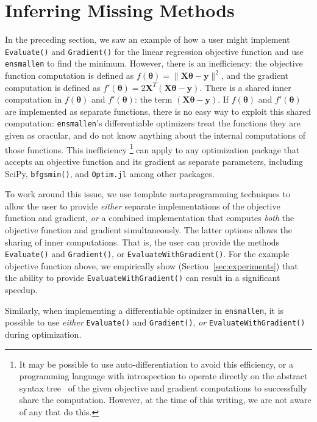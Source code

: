 \section{Inferring Missing Methods}
\label{sec:automatic}

In the preceding section, we saw an example of how a user might implement {\tt
Evaluate()} and {\tt Gradient()} for the linear regression objective function
and use {\tt ensmallen} to find the minimum.
However, there is an inefficiency:
the objective function computation is defined as $f(\bm \theta) = \| \bm X \bm \theta - \bm y \|^2$,
and the gradient computation is defined as $f'(\bm \theta) = 2 \bm X^T (\bm X \bm \theta - \bm y)$.
There is a shared inner computation in $f(\bm \theta)$ and $f'(\bm \theta)$: the
term $(\bm X \bm \theta - \bm y)$.
If $f(\bm \theta)$ and $f'(\bm \theta)$ are implemented as separate functions,
there is no easy way to exploit this shared computation:
{\tt ensmallen}'s differentiable optimizers treat the functions they are given as oracular,
and do not know anything about the internal computations of those functions.
This inefficiency%
\footnote
  {It may be possible to use auto-differentiation to avoid this efficiency,
  or a programming language with introspection to operate directly on the
  abstract syntax tree~\cite{TODO} of the given objective and gradient
  computations to successfully share the computation.  However, at the time of
  this writing, we are not aware of any that do this.
  }
can apply to any optimization package that accepts an objective
function and its gradient as separate parameters, including SciPy, {\tt bfgsmin()},
and {\tt Optim.jl} among other packages.

To work around this issue, we use template metaprogramming techniques to allow
the user to provide {\it either} separate implementations of the objective
function and gradient, {\it or} a combined implementation that computes {\it
both} the objective function and gradient simultaneously.
The latter options allows the sharing of inner computations.
That is, the user can provide the methods {\tt Evaluate()} and {\tt Gradient()},
or {\tt EvaluateWithGradient()}.
For the example objective function above,
we empirically show (Section~\ref{sec:experiments}) that the ability to provide
{\tt EvaluateWithGradient()} can result in a significant speedup.

Similarly, when implementing a differentiable optimizer in {\tt ensmallen},
it is possible to use {\it either} {\tt Evaluate()} and {\tt Gradient()},
{\it or} {\tt EvaluateWithGradient()} during optimization.

